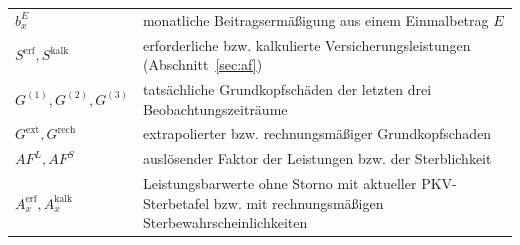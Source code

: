 \begin{center}
\begin{longtable}{@{}lp{13.5cm}@{}}
$b^{E}_x$ & monatliche Beitragsermäßigung aus einem Einmalbetrag $E$ \\
$S^{\mathrm{erf}}, S^{\mathrm{kalk}}$ & erforderliche bzw. kalkulierte Versicherungsleistungen (Abschnitt~\ref{sec:af}) \\
$G^{(1)}, G^{(2)}, G^{(3)}$ & tatsächliche Grundkopfschäden der letzten drei Beobachtungszeiträume \\
$G^{\mathrm{ext}}, G^{\mathrm{rech}}$ & extrapolierter bzw. rechnungsmäßiger Grundkopfschaden \\
$AF^{L}, AF^{S}$ & auslösender Faktor der Leistungen bzw. der Sterblichkeit \\
$A^{\mathrm{erf}}_x, A^{\mathrm{kalk}}_x$ & Leistungsbarwerte ohne Storno mit aktueller PKV-Sterbetafel bzw. mit rechnungsmäßigen Sterbewahrscheinlichkeiten \\
\end{longtable}
\end{center}
\addtocounter{table}{-1}
